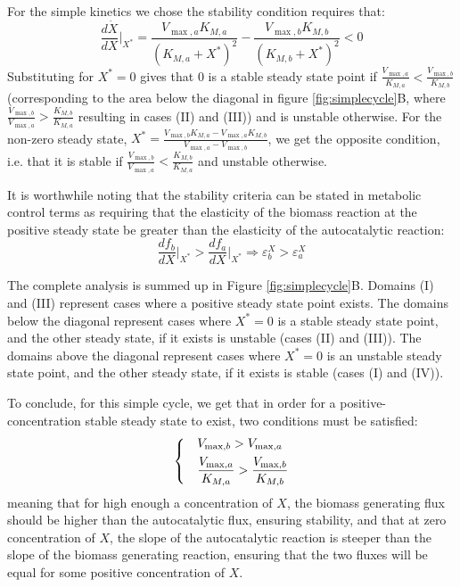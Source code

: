 \documentclass[a4page,notitlepage]{article}
\begin{document}
    For the simple kinetics we chose the stability condition requires that:
    \begin{equation*}
      \frac{d\dot X}{dX}\Big\vert_{X^*} = \frac{V_{\max,a}K_{M,a}}{(K_{M,a}+X^*)^2}-\frac{V_{\max,b}K_{M,b}}{(K_{M,b}+X^*)^2}<0
    \end{equation*}
    Substituting for $X^*=0$ gives that $0$ is a stable steady state point if $\frac{V_{\max,a}}{K_{M,a}}<\frac{V_{\max,b}}{K_{M,b}}$ (corresponding to the area below the diagonal in figure \ref{fig:simplecycle}B, where $\frac{V_{\max,b}}{V_{\max,a}}>\frac{K_{M,b}}{K_{M,a}}$ resulting in cases (II) and (III)) and is unstable otherwise.
    For  the non-zero steady state, $X^*=\frac{V_{\max,b}K_{M,a}-V_{\max,a}K_{M,b}}{V_{\max,a}-V_{\max,b}}$, we get the opposite condition, i.e. that it is stable if $\frac{V_{\max,b}}{V_{\max,a}}<\frac{K_{M,b}}{K_{M,a}}$ and unstable otherwise.

    It is worthwhile noting that the stability criteria can be stated in metabolic control terms \cite{Fell1997-bp} as requiring that the elasticity of the biomass reaction at the positive steady state be greater than the elasticity of the autocatalytic reaction:
    \begin{equation*}
      \frac{df_b}{dX}\Big\vert_{X^*}>\frac{df_a}{dX}\Big\vert_{X^*} \Rightarrow \varepsilon^X_b>\varepsilon^X_a
    \end{equation*}
    
    The complete analysis is summed up in Figure \ref{fig:simplecycle}B.
    Domains (I) and (III) represent cases where a positive steady state point exists.
    The domains below the diagonal represent cases where $X^*=0$ is a stable steady state point, and the other steady state, if it exists is unstable (cases (II) and (III)).
    The domains above the diagonal represent cases where $X^*=0$ is an unstable steady state point, and the other steady state, if it exists is stable (cases (I) and (IV)).

    To conclude, for this simple cycle, we get that in order for a positive-concentration stable steady state to exist, two conditions must be satisfied:
    \begin{equation}
    \label{eq:stabconds}
    \begin{dcases}
      & V_{\max,b}>V_{\max,a} \\
      & \frac{V_{\max,a}}{K_{M,a}}>\frac{V_{\max,b}}{K_{M,b}}
    \end{dcases}
    \end{equation}
    meaning that for high enough a concentration of $X$, the biomass generating flux should be higher than the autocatalytic flux, ensuring stability, and that at zero concentration of $X$, the slope of the autocatalytic reaction is steeper than the slope of the biomass generating reaction, ensuring that the two fluxes will be equal for some positive concentration of $X$.
\end{document}
